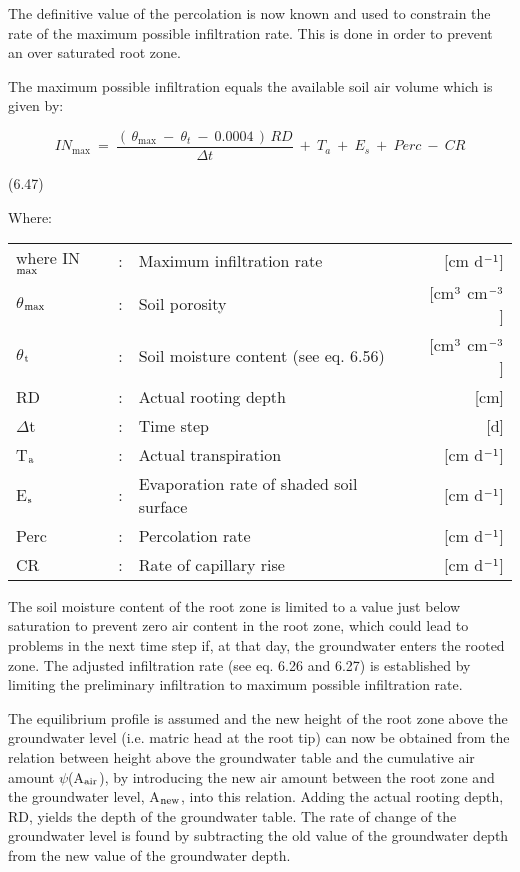 The definitive value of the percolation is now known and used to constrain the rate of the
maximum possible infiltra\-tion rate. This is done in order to prevent an over saturated root
zone.









The maximum possible infiltration equals the available soil air volume which is given by:

\begin{equation}
IN _{\max } ~=~{\frac{(\, \theta _{\max } ~-~ \theta _{t} ~-~ 0.0004\, )\, RD}{\Delta t}} ~+~ T _{a} ~+~ E _{s} ~+~ Perc ~-~ CR
\end{equation}

 
\strut\hfill (6.47)

Where:\\
\begin{tabularx}{\textwidth}{llXr}



where IN$_{{\rm max}}$ &:& Maximum infiltration rate  & [cm d$^{{\rm -1}}$]\\
$\theta$$_{{\rm max}}$ &:& Soil porosity  & [cm$^{{\rm 3}}$ cm$^{{\rm -3}}$]\\
$\theta$$_{{\rm t}}$ &:& Soil moisture content (see eq. 6.56)  & [cm$^{{\rm 3}}$ cm$^{{\rm -3}}$]\\
RD &:& Actual rooting depth  & [cm]\\
$\Delta$t &:& Time step  & [d]\\
T$_{{\rm a}}$ &:& Actual transpiration  & [cm d$^{{\rm -1}}$]\\
E$_{{\rm s}}$ &:& Evaporation rate of shaded soil surface  & [cm d$^{{\rm -1}}$]\\
Perc &:& Percolation rate  & [cm d$^{{\rm -1}}$]\\
CR &:& Rate of capillary rise  & [cm d$^{{\rm -1}}$]
\end{tabularx}


The soil moisture content of the root zone is limited to a value just below saturation to
prevent zero air content in the root zone, which could lead to problems in the next time
step if, at that day, the groundwater enters the rooted zone. The adjusted infiltration rate
(see eq. 6.26 and 6.27) is established by limiting the preliminary infiltration to maximum
possible infiltration rate.



The equilibrium profile is assumed and the new height of the root zone above the
groundwater level (i.e. matric head at the root tip) can now be obtained from the relation
between height above the groundwater table and the cumulative air amount $\psi$(A$_{{\rm air}}$), by
introducing the new air amount between the root zone and the groundwater level, A$_{{\rm new}}$,
into this relation. Adding the actual rooting depth, RD, yields the depth of the groundwa\-ter table. The rate of change of the groundwater level is found by subtracting the old
value of the groundwater depth from the new value of the groundwater depth. 

